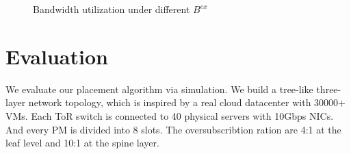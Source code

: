 \documentclass[review]{elsarticle}
\begin{document}
\begin{figure}
	\centering
	\caption{Bandwidth utilization under different $B^{ex}$}
	\label{fig:bw_util}
\end{figure}

\section{Evaluation}\label{sec:simulation}
We evaluate our placement algorithm via simulation. We build a tree-like three-layer network topology, which is inspired by a real cloud datacenter with 30000+ VMs. Each ToR switch is connected to 40 physical servers with 10Gbps NICs. And every PM is divided into 8 slots. The oversubscribtion ration are 4:1 at the leaf level and 10:1 at the spine layer.  
\end{document}
